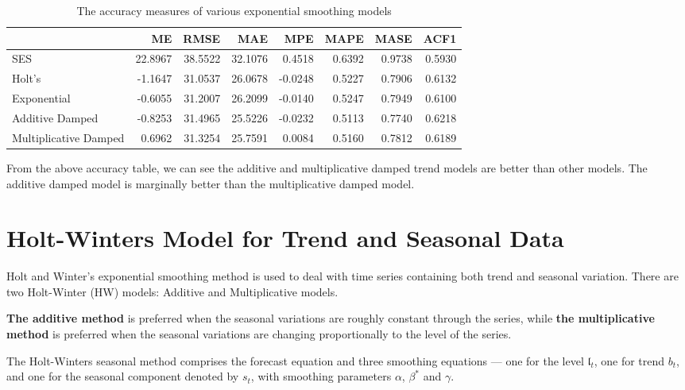 \documentclass[
]{book}
\begin{document}
\begin{table}

\caption{\label{tab:unnamed-chunk-243}The accuracy measures of various exponential 
      smoothing models}
\centering
\begin{tabular}[t]{l|r|r|r|r|r|r|r}
\hline
  & ME & RMSE & MAE & MPE & MAPE & MASE & ACF1\\
\hline
SES & 22.8967 & 38.5522 & 32.1076 & 0.4518 & 0.6392 & 0.9738 & 0.5930\\
\hline
Holt's & -1.1647 & 31.0537 & 26.0678 & -0.0248 & 0.5227 & 0.7906 & 0.6132\\
\hline
Exponential & -0.6055 & 31.2007 & 26.2099 & -0.0140 & 0.5247 & 0.7949 & 0.6100\\
\hline
Additive Damped & -0.8253 & 31.4965 & 25.5226 & -0.0232 & 0.5113 & 0.7740 & 0.6218\\
\hline
Multiplicative Damped & 0.6962 & 31.3254 & 25.7591 & 0.0084 & 0.5160 & 0.7812 & 0.6189\\
\hline
\end{tabular}
\end{table}

From the above accuracy table, we can see the additive and multiplicative damped trend models are better than other models. The additive damped model is marginally better than the multiplicative damped model.

\hypertarget{holt-winters-model-for-trend-and-seasonal-data}{%
\section{Holt-Winters Model for Trend and Seasonal Data}\label{holt-winters-model-for-trend-and-seasonal-data}}

Holt and Winter's exponential smoothing method is used to deal with time series containing both trend and seasonal variation. There are two Holt-Winter (HW) models: Additive and Multiplicative models.

\textbf{The additive method} is preferred when the seasonal variations are roughly constant through the series, while \textbf{the multiplicative method} is preferred when the seasonal variations are changing proportionally to the level of the series.

The Holt-Winters seasonal method comprises the forecast equation and three smoothing equations --- one for the level \(\mathfrak{l}_t\), one for trend \(b_t\), and one for the seasonal component denoted by \(s_t\), with smoothing parameters \(\alpha\), \(\beta^*\) and \(\gamma\).
\end{document}
